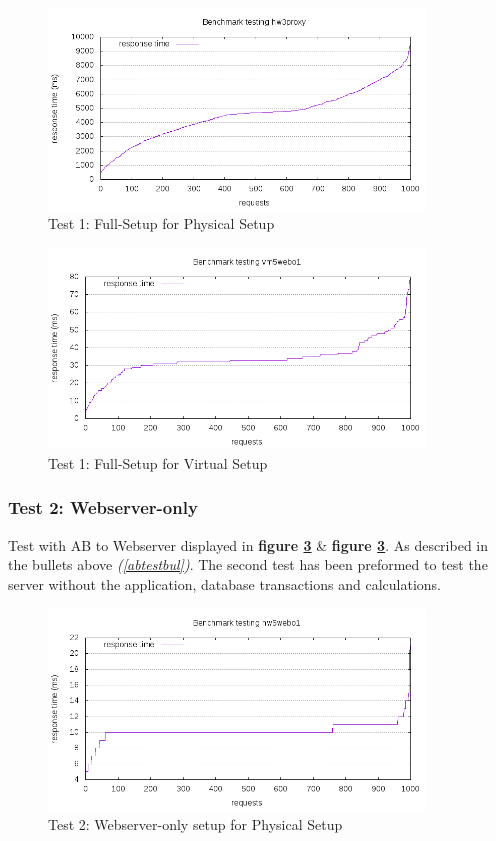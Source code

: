  \begin{figure}[H]
    \centering
    \includegraphics[width=10cm]{Pictures/abresult_hw_1.png}
    \caption{Test 1: Full-Setup for Physical Setup}
    \label{fig:resA1hw}
\end{figure}
\begin{figure}[H]
    \centering
    \includegraphics[width=10cm]{Pictures/abresult_vm_2.png}
    \caption{Test 1: Full-Setup for Virtual Setup}
    \label{fig:resA1hw}
\end{figure} 

\subsubsection{Test 2: Webserver-only}
Test with AB to Webserver displayed in \textbf{figure \ref{fig:resA2hw}} \& \textbf{figure \ref{fig:resA2hw}}. As described in the bullets above \textit{(\ref{abtestbul})}.
The second test has been preformed to test the server without the application, database transactions and calculations.

 \begin{figure}[H]
    \centering
    \includegraphics[width=10cm]{Pictures/abresult_hw_2.png}
    \caption{Test 2: Webserver-only setup for Physical Setup}
    \label{fig:resA2hw}
\end{figure}
   
